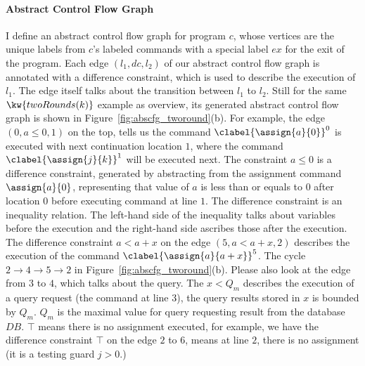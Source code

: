 \paragraph*{Abstract Control Flow Graph}
I define an abstract control flow graph for program $c$, 
whose vertices are the unique labels from $c$'s labeled commands with
a special label $ex$ for the exit of the program. Each edge $(l_1, dc , l_2)$ of our abstract control flow graph is annotated with a difference constraint, which is used to describe the execution of $l_1$. The edge itself talks about the  transition between $l_1$ to $l_2$. Still for the same $\kw{twoRounds(k)}$ example as overview, its generated abstract control flow graph is shown in Figure~\ref{fig:abscfg_tworound}(b).
For example, the edge $(0, a \leq 0, 1)$ on the top, tells us the command 
$\clabel{\assign{a}{0}}^0$ is executed with next continuation location $1$,
where the 
command $\clabel{\assign{j}{k}}^1$ will be executed next.
The constraint $a \leq 0$ is a difference constraint, generated by abstracting from the assignment command $\assign{a}{0}$,
representing that value of $a$ is less than or equals to $0$ after 
location $0$ before executing command at line $1$. The difference constraint is an inequality relation. The left-hand side of the inequality talks about variables before the execution and the right-hand side ascribes those after the execution. 
The difference constraint $a < a+x $ on the edge $(5, a < a + x, 2)$ describes the execution of the command $\clabel{\assign{a}{a + x}}^5$.
The cycle $2 \to 4 \to 5 \to 2$ in Figure~\ref{fig:abscfg_tworound}(b). 
Please also look at the edge from $3$ to $4$, which talks about the query. The $x < Q_m$ describes the execution of a query request (the command at line 3), the query results stored in $x$ is bounded by $Q_m$.
$Q_m$ is the maximal value for query requesting result from the database $DB$. $\top$ means there is no assignment executed, for example, we have the difference constraint $\top$ on the edge $2$ to $6$, means at line $2$, there is no assignment (it is a testing guard $j>0$.) 
%

